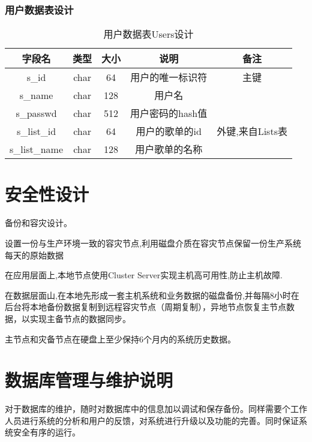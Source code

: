 \subsubsection{用户数据表设计}
\begin{table}[htbp]
	\centering
	\caption{用户数据表Users设计} \label{tab:users-database}
	\begin{tabular}{|c|c|c|c|c|}
		\hline
		字段名 & 类型 & 大小 & 说明 & 备注 \\
		\hline
		s\_id & char & 64 & 用户的唯一标识符 & 主键 \\
		\hline
		s\_name & char & 128 & 用户名 & \\
		\hline
		s\_passwd & char & 512 & 用户密码的hash值 & \\
		\hline
		s\_list\_id & char & 64 & 用户的歌单的id & 外键,来自Lists表 \\
		\hline
		s\_list\_name & char & 128 & 用户歌单的名称 & \\
		\hline
	\end{tabular}
\end{table}

\section{安全性设计}
备份和容灾设计。

设置一份与生产环境一致的容灾节点,利用磁盘介质在容灾节点保留一份生产系统每天的原始数据

在应用层面上,本地节点使用Cluster Server实现主机高可用性,防止主机故障.

在数据层面山,在本地先形成一套主机系统和业务数据的磁盘备份,并每隔8小时在后台将本地备份数据复制到远程容灾节点（周期复制），异地节点恢复主节点数据，以实现主备节点的数据同步。 

主节点和灾备节点在硬盘上至少保持6个月内的系统历史数据。 

\section{数据库管理与维护说明}
对于数据库的维护，随时对数据库中的信息加以调试和保存备份。同样需要个工作人员进行系统的分析和用户的反馈，对系统进行升级以及功能的完善。同时保证系统安全有序的运行。